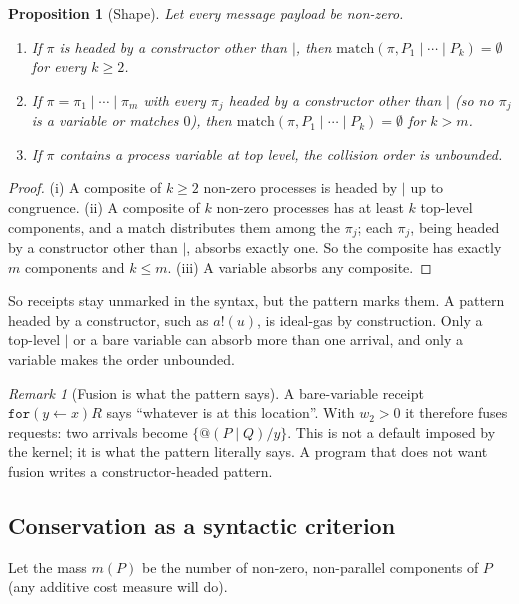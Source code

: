 \documentclass[11pt,a4paper]{article}
\theoremstyle{plain}
\newtheorem{proposition}[theorem]{Proposition}
\theoremstyle{definition}
\theoremstyle{remark}
\newtheorem{remark}[theorem]{Remark}
\newcommand{\match}{\mathrm{match}}
\newcommand{\code}[1]{\texttt{#1}}
\begin{document}
\begin{proposition}[Shape]\label{prop:shape}
Let every message payload be non-zero.
\begin{enumerate}[label=(\roman*)]
\item If $\pi$ is headed by a constructor other than $\mid$, then
$\match(\pi,P_1\mid\cdots\mid P_k)=\emptyset$ for every $k\geq2$.
\item If $\pi=\pi_1\mid\cdots\mid\pi_m$ with every $\pi_j$ headed by a
constructor other than $\mid$ (so no $\pi_j$ is a variable or matches $0$),
then $\match(\pi,P_1\mid\cdots\mid P_k) = \emptyset$ for $k>m$.
\item If $\pi$ contains a process variable at top level, the collision order
is unbounded.
\end{enumerate}
\end{proposition}

\begin{proof}
(i) A composite of $k\geq2$ non-zero processes is headed by $\mid$ up to
congruence. (ii) A composite of $k$ non-zero processes has at least $k$
top-level components, and a match distributes them among the $\pi_j$; each
$\pi_j$, being headed by a constructor other than $\mid$, absorbs exactly one.
So the composite has exactly $m$ components and $k\leq m$. (iii) A variable
absorbs any composite.
\end{proof}

So receipts stay unmarked in the syntax, but the pattern marks them. A pattern
headed by a constructor, such as $a!(u)$, is ideal-gas by construction. Only a
top-level $\mid$ or a bare variable can absorb more than one arrival, and only
a variable makes the order unbounded.

\begin{remark}[Fusion is what the pattern says]\label{rem:fusion}
A bare-variable receipt $\code{for}(y\leftarrow x)R$ says ``whatever is at this
location''. With $w_2>0$ it therefore fuses requests: two arrivals become
$\{@(P\mid Q)/y\}$. This is not a default imposed by the kernel; it is what the
pattern literally says. A program that does not want fusion writes a
constructor-headed pattern.
\end{remark}

\subsection{Conservation as a syntactic criterion}

Let the mass $m(P)$ be the number of non-zero, non-parallel components of $P$
(any additive cost measure will do).
\end{document}
